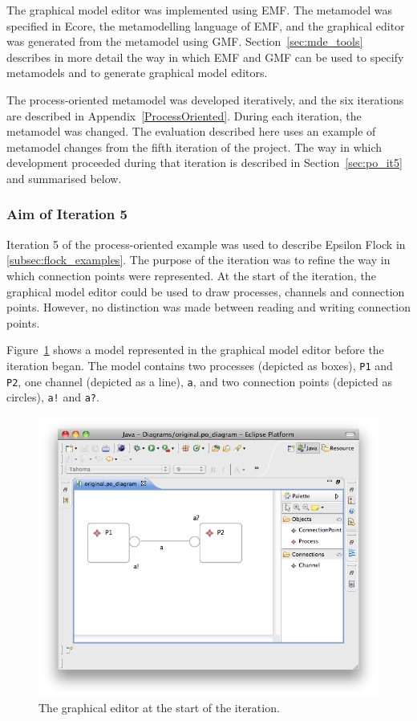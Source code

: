 The graphical model editor was implemented using EMF. The metamodel was specified in Ecore, the metamodelling language of EMF, and the graphical editor was generated from the metamodel using GMF. Section~\ref{sec:mde_tools} describes in more detail the way in which EMF and GMF can be used to specify metamodels and to generate graphical model editors.

The process-oriented metamodel was developed iteratively, and the six iterations are described in Appendix~\ref{ProcessOriented}. During each iteration, the metamodel was changed. The evaluation described here uses an example of metamodel changes from the fifth iteration of the project. The way in which development proceeded during that iteration is described in Section~\ref{sec:po_it5} and summarised below.

\subsubsection{Aim of Iteration 5}
Iteration 5 of the process-oriented example was used to describe Epsilon Flock in \ref{subsec:flock_examples}. The purpose of the iteration was to refine the way in which connection points were represented. At the start of the iteration, the graphical model editor could be used to draw processes, channels and connection points. However, no distinction was made between reading and writing connection points.

Figure~\ref{fig:po_original_editor} shows a model represented in the graphical model editor before the iteration began. The model contains two processes (depicted as boxes), \texttt{P1} and \texttt{P2}, one channel (depicted as a line), \texttt{a}, and two connection points (depicted as circles), \texttt{a!} and \texttt{a?}.

\begin{figure}[htbp]
	\centering
	\includegraphics[width=13.5cm]{6.Evaluation/images/user_driven/po_original_editor.png}
	\caption{The graphical editor at the start of the iteration.}
	\label{fig:po_original_editor}
\end{figure}


